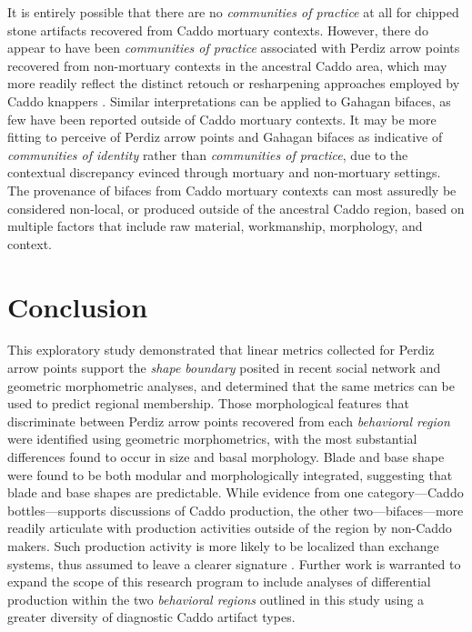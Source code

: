 \documentclass[smallextended]{svjour3}       %
\begin{document}
It is entirely possible that there are no \emph{communities of practice}
at all for chipped stone artifacts recovered from Caddo mortuary
contexts. However, there do appear to have been \emph{communities of
practice} associated with Perdiz arrow points recovered from
non-mortuary contexts in the ancestral Caddo area, which may more
readily reflect the distinct retouch or resharpening approaches employed
by Caddo knappers \cite{RN9364}. Similar interpretations can be applied
to Gahagan bifaces, as few have been reported outside of Caddo mortuary
contexts. It may be more fitting to perceive of Perdiz arrow points and
Gahagan bifaces as indicative of \emph{communities of identity} rather
than \emph{communities of practice}, due to the contextual discrepancy
evinced through mortuary and non-mortuary settings. The provenance of
bifaces from Caddo mortuary contexts can most assuredly be considered
non-local, or produced outside of the ancestral Caddo region, based on
multiple factors that include raw material, workmanship, morphology, and
context.

\hypertarget{conclusion}{%
\section{Conclusion}\label{conclusion}}

This exploratory study demonstrated that linear metrics collected for
Perdiz arrow points support the \emph{shape boundary} posited in recent
social network and geometric morphometric analyses, and determined that
the same metrics can be used to predict regional membership. Those
morphological features that discriminate between Perdiz arrow points
recovered from each \emph{behavioral region} were identified using
geometric morphometrics, with the most substantial differences found to
occur in size and basal morphology. Blade and base shape were found to
be both modular and morphologically integrated, suggesting that blade
and base shapes are predictable. While evidence from one
category---Caddo bottles---supports discussions of Caddo production, the
other two---bifaces---more readily articulate with production activities
outside of the region by non-Caddo makers. Such production activity is
more likely to be localized than exchange systems, thus assumed to leave
a clearer signature \cite{RN7019}. Further work is warranted to expand
the scope of this research program to include analyses of differential
production within the two \emph{behavioral regions} outlined in this
study using a greater diversity of diagnostic Caddo artifact types.
\end{document}
